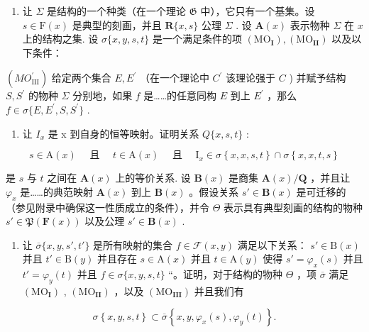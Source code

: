 \begin{enumerate}
\def\labelenumi{\arabic{enumi}.}
\setcounter{enumi}{10}
\tightlist
\item
  让 \(\Sigma\) 是结构的一个种类（在一个理论 \(\mathfrak{G}\) 中），它只有一个基集。设 \(s \in \mathrm{F}(x)\) 是典型的刻画，并且 \(\mathbf{R}\{x, s\}\) 公理 \(\Sigma\) . 设 \(\mathbf{A}(x)\) 表示物种 \(\Sigma\) 在 \(x\) 上的结构之集. 设 \(\sigma\{x, y, s, t\}\) 是一个满足条件的项 \((\mathrm{MO}_{\mathbf{I}}), (\mathrm{MO}_{\mathbf{II}})\) 以及以下条件：
\end{enumerate}

\((MO_{\mathrm{III}}^{\prime})\) 给定两个集合 \(E, E^{\prime}\) （在一个理论中 \(C^{\prime}\) 该理论强于 \(C\) ) 并赋予结构 \(S, S^{\prime}\) 的物种 \(\Sigma\) 分别地，如果 \(f\) 是……的任意同构 \(E\) 到上 \(E^{\prime}\) ，那么 \(f \in \sigma \{E, E^{\prime}, S, S^{\prime}\}\) .

\begin{enumerate}
\def\labelenumi{(\alph{enumi})}
\tightlist
\item
  让 \(I_{x}\) 是 x 到自身的恒等映射。证明关系 \(Q\{x, s, t\}\) :
\end{enumerate}

\[
s \in \mathrm{A} (x) \quad \text { 且 } \quad t \in \mathrm{A} (x) \quad \text { 且 } \quad \mathrm{I} _ {x} \in \sigma \left\{x, x, s, t \right\} \cap \sigma \left\{x, x, t, s \right\}
\]

是 \(s\) 与 \(t\) 之间在 \(\mathbf{A}(x)\) 上的等价关系. 设 \(\mathbf{B}(x)\) 是商集 \(\mathbf{A}(x)/\mathbf{Q}\) ，并且让 \(\varphi_x\) 是……的典范映射 \(\mathbf{A}(x)\) 到上 \(\mathbf{B}(x)\) 。假设关系 \(s' \in \mathbf{B}(x)\) 是可迁移的（参见附录中确保这一性质成立的条件），并令 \(\Theta\) 表示具有典型刻画的结构的物种 \(s' \in \mathfrak{P}(\mathbf{F}(x))\) 以及公理 \(s' \in \mathbf{B}(x)\) .

\begin{enumerate}
\def\labelenumi{(\alph{enumi})}
\setcounter{enumi}{1}
\tightlist
\item
  让 \(\overline{\sigma}\{x, y, s', t'\}\) 是所有映射的集合 \(f \in \mathcal{F}(x, y)\) 满足以下关系： \(s' \in \mathrm{B}(x)\) 并且 \(t' \in \mathrm{B}(y)\) 并且存在 \(s \in \mathrm{A}(x)\) 并且 \(t \in \mathrm{A}(y)\) 使得 \(s' = \varphi_x(s)\) 并且 \(t' = \varphi_y(t)\) 并且 \(f \in \sigma\{x, y, s, t\}\) “。证明，对于结构的物种 \(\Theta\) ，项 \(\overline{\sigma}\) 满足 \((\mathrm{MO}_{\mathbf{I}})\) , \((\mathrm{MO}_{\mathbf{II}})\) ，以及 \((\mathrm{MO}_{\mathbf{III}})\) 并且我们有
\end{enumerate}

\[
\sigma \left\{x, y, s, t \right\} \subset \overline {{\sigma}} \left\{x, y, \varphi_ {x} (s), \varphi_ {y} (t) \right\}.
\]

